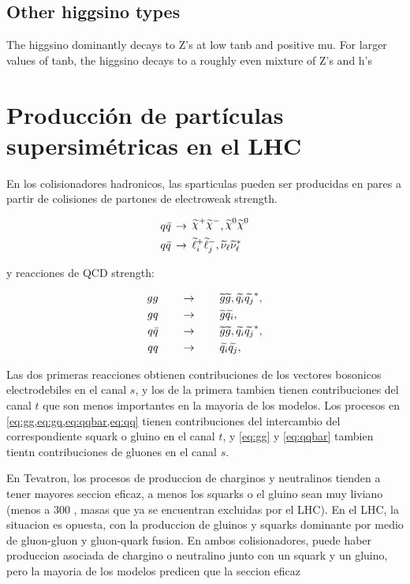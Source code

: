 \subsection{Other higgsino types}

The higgsino dominantly decays to Z's at low tanb and positive mu. For larger values of tanb, the higgsino decays to a roughly even mixture of Z's and h's


\section{Producción de partículas supersimétricas en el LHC}


En los colisionadores hadronicos, las sparticulas pueden ser producidas en pares a partir
de colisiones de partones de electroweak strength.

\begin{align}
  &q\bar{q} \, \to \, \chinop \chinom, \nino \nino \\
  &q\bar{q} \, \to \, \susy{\ell}^{+}_{i}\susy{\ell}^{-}_{j}, \susy{\nu}_{\ell}\susy{\nu}^{*}_{\ell}
\end{align}

y reacciones de QCD strength:

\begin{align}
  gg \qquad &\rightarrow \qquad \widetilde{g}\widetilde{g}, \widetilde{q_i}\widetilde{q_j}^{*}, \label{eq:gg}\\
  gq \qquad &\rightarrow \qquad \widetilde{g}\widetilde{q_i}, \label{eq:gq} \\
  q\bar{q} \qquad &\rightarrow \qquad \widetilde{g}\widetilde{g}, \widetilde{q_i}\widetilde{q_j}^{*}, \label{eq:qqbar} \\
  qq \qquad &\rightarrow \qquad \widetilde{q_i}\widetilde{q_j}, \label{eq:qq} \\
\end{align}

Las dos primeras reacciones obtienen contribuciones de los vectores bosonicos
electrodebiles en el canal $s$, y los de la primera tambien tienen contribuciones
del canal $t$ que son menos importantes en la mayoria de los modelos.
Los procesos en \eqref{eq:gg,eq:gq,eq:qqbar,eq:qq} tienen contribuciones del intercambio
del correspondiente squark o gluino en el canal $t$, y \eqref{eq:gg} y \eqref{eq:qqbar}
tambien tientn contribuciones de gluones en el canal $s$.


En Tevatron, los procesos de produccion de charginos y neutralinos tienden a tener
mayores seccion eficaz, a menos los squarks o el gluino sean muy liviano (menos a 300 \gev,
masas que ya se encuentran excluidas por el LHC). En el LHC, la situacion es opuesta, con la
produccion de gluinos y squarks dominante por medio de gluon-gluon y gluon-quark fusion.
En ambos colisionadores, puede haber produccion asociada de chargino o neutralino junto con
un squark y un gluino, pero la mayoria de los modelos predicen que la seccion eficaz




